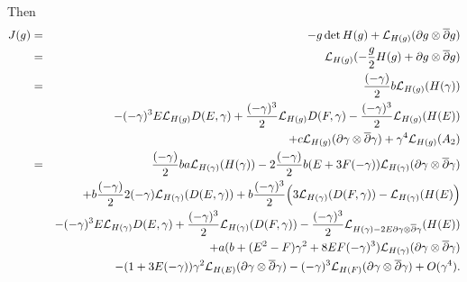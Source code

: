 \documentclass[12pt]{amsart}
\def\d{\partial}
\def\dbar{\overline{\partial}}
\def\d{\partial}
\def\cal{\mathcal}
\begin{document}
Then
\begin{eqnarray*}
J(g)&=&-g \det H(g)+{\cal L}_{H(g)}(\d g\otimes \dbar g)\\
&=&{\cal L}_{H(g)}(-{g \over 2} H(g)+\d g\otimes \dbar g)\\
&=&{(-\gamma)  \over 2} b {\cal L}_{H(g)}(H(\gamma))\nonumber
\\
&&
-(-\gamma)^3 E{\cal L}_{H(g)} D(E, \gamma)+{  (-\gamma) ^3 \over 2} {\cal L}_{H(g)} D(F, \gamma)
-{(-\gamma)^3 \over 2}  {\cal L}_{H(g)} (H(E)) \\
&&+c  {\cal L}_{H(g)} (\d \gamma \otimes \dbar \gamma) +\gamma^4 {\cal L}_{H(g)}(A_2)
\\
&=&{(-\gamma)  \over 2} b  a {\cal L}_{H(\gamma)}(H(\gamma))\nonumber
-2{(-\gamma)\over 2} b (E+3F(-\gamma)) {\cal L}_{H(\gamma)}( \d \gamma \otimes\dbar \gamma) \nonumber\\
&&+b {(-\gamma)\over 2}2(-\gamma) {\cal L}_{H(\gamma)}(D(E, \gamma)) +b{(-\gamma)^3\over 2}\Big(3 {\cal L}_{H(\gamma)}(D(F,\gamma))-{\cal L}_{H(\gamma)}(H(E)\Big)\\
&&
-(-\gamma)^3 E {\cal L}_{H(\gamma)} D(E, \gamma)+{  (-\gamma) ^3 \over 2} {\cal L}_{H(\gamma)} (D(F, \gamma))
-{(-\gamma)^3 \over 2}  {\cal L}_{H(\gamma)-2E \d \gamma \otimes \dbar \gamma } (H(E)) \\
&&+ a (b+(E^2-F)\gamma^2+8EF(-\gamma)^3)  {\cal L}_{H(\gamma)} (\d \gamma \otimes \dbar \gamma)\\
&&-(1+3E(-\gamma)) \gamma^2 {\cal L}_{H(E)}(\d \gamma\otimes \dbar \gamma)-(-\gamma)^3 {\cal L}_{H(F)}(\d \gamma \otimes \dbar \gamma) +O(\gamma^4 ).
\end{eqnarray*}
\end{document}
